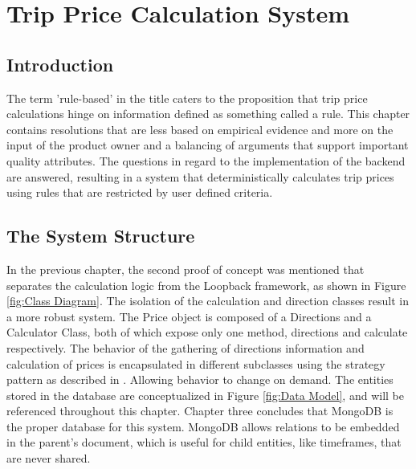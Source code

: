 \graphicspath{{Chapter4/Figs/Vector/}{Chapter4/Figs/}}

\chapter{Trip Price Calculation System}
\section{Introduction}
The term 'rule-based' in the title caters to the proposition that trip price calculations hinge on information defined as something called a rule. This chapter contains resolutions that are less based on empirical evidence and more on the input of the product owner and a balancing of arguments that support important quality attributes. The questions in regard to the implementation of the backend are answered, resulting in a system that deterministically calculates trip prices using rules that are restricted by user defined criteria.

\section{The System Structure}
In the previous chapter, the second proof of concept was mentioned that separates the calculation logic from the Loopback framework, as shown in Figure \ref{fig:Class Diagram}. The isolation of the calculation and direction classes result in a more robust system. The Price object is composed of a Directions and a Calculator Class, both of which expose only one method, directions and calculate respectively. The behavior of the gathering of directions information and calculation of prices is encapsulated in different subclasses using the strategy pattern as described in \cite{gof}. Allowing behavior to change on demand. The entities stored in the database are conceptualized in Figure \ref{fig:Data Model}, and will be referenced throughout this chapter. Chapter three concludes that MongoDB is the proper database for this system. MongoDB allows relations to be embedded in the parent's document, which is useful for child entities, like timeframes, that are never shared.

